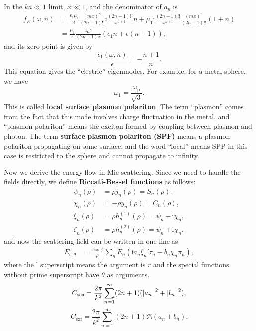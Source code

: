 \documentclass[hyperref, a4paper]{article}
\newcommand*{\ii}{\mathrm{i}}
\newcommand*{\concept}[1]{{\textbf{#1}}}
\begin{document}
In the $ka \ll 1$ limit, $x \ll 1$, and the denominator of $a_n$ is 
\begin{equation}
    \begin{aligned}
        f_E(\omega, n) &= \frac{\epsilon_1 \mu_1}{\epsilon} \frac{(mx)^n}{(2n+1) !!} \ii \frac{(2n-1)!!}{x^{n+1}} n
        + \mu_1 \ii \frac{(2n-1)!!}{x^{n+1}} \frac{(mx)^n}{(2n+1)!!} (1+n) \\
        &= \frac{\mu_1}{\epsilon} \frac{\ii m^n}{(2n+1) x} (\epsilon_1 n + \epsilon (n+1)),
    \end{aligned}
\end{equation}
and its zero point is given by 
\begin{equation}
    \frac{\epsilon_1(\omega, n)}{\epsilon} = - \frac{n+1}{n}.
\end{equation}
This equation gives the ``electric'' eigenmodes. For example, for a metal sphere, we have 
\begin{equation}
    \omega_1 = \frac{\omega_\text{p}}{\sqrt{3}}. 
\end{equation}
This is called \concept{local surface plasmon polariton}. The term ``plasmon'' comes from the fact that 
this mode involves charge fluctuation in the metal, and ``plasmon polariton'' means the exciton formed by 
coupling between plasmon and photon. The term \concept{surface plasmon polariton (SPP)} means a plasmon polariton 
propagating on some surface, and the word ``local'' means SPP in this case is restricted to the sphere and 
cannot propagate to infinity. 

Now we derive the energy flow in Mie scattering. Since we need to handle the fields directly, 
we define \concept{Riccati-Bessel functions} as follows:
\begin{equation}
    \begin{aligned}
        \psi_n(\rho) &= \rho j_n(\rho) = S_n(\rho), \\
        \chi_n(\rho) &= - \rho y_n(\rho) = C_n(\rho), \\
        \xi_n(\rho) &= \rho h_n^{(1)}(\rho) = \psi_n - \ii \chi_n, \\
        \zeta_n(\rho) &= \rho h_n^{(2)}(\rho) = \psi_n + \ii \chi_n,
    \end{aligned}
\end{equation}
and now the scattering field can be written in one line as 
\begin{equation}
    \begin{aligned}
        E_{\text{s}, \theta} &= \frac{\cos \phi}{\rho} \sum_n E_n (\ii a_n \xi_n' \tau_n - b_n \chi_n \pi_n) , 
    \end{aligned}
\end{equation}
where the $^\prime$ superscript means the argument is $r$ and the special functions without prime superscript
have $\theta$ as arguments. 
\begin{equation}
    C_\text{sca} = \frac{2\pi}{k^2} \sum_{n=1}^\infty (2n+1) (\abs*{a_n}^2 + \abs*{b_n}^2),
\end{equation}
\begin{equation}
    C_\text{ext} = \frac{2\pi}{k^2} \sum_{n=1}^\infty (2n+1) \Re (a_n + b_n).
\end{equation}
\end{document}
